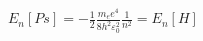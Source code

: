 \documentclass[preview]{standalone}
\begin{document}
\begin{center}
$E_n [Ps] = - \frac{1}{2} \frac{m_e e^4}{8h^2 \varepsilon_0^2}\frac{1}{n^2} = E_n[H]$
\end{center}
\end{document}
